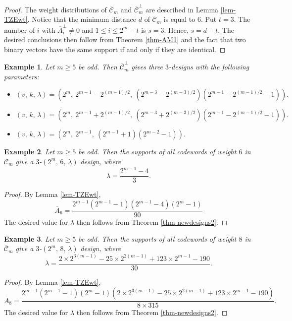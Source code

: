 \documentclass[1p,final]{elsarticle}
\newtheorem{example}{Example}
\newcommand{\C}{{\mathcal{C}}}
\begin{document}
\begin{proof}
The weight distributions of $\overline{\C}_m$ and $\overline{\C}_m^\perp$ are described in 
Lemma \ref{lem-TZEwt}. 
Notice that the minimum distance $d$ of $\overline{\C}_m$ is equal to $6$. Put $t=3$. The number
of $i$ with $\overline{A}_i^\perp \neq 0$ and $1 \leq i \leq 2^m -t$ is $s=3$. Hence, $s=d-t$.
The desired conclusions then follow from Theorem \ref{thm-AM1} and the fact that two binary 
vectors have the same support if and only if they are identical. 
\end{proof} 

\begin{example} 
Let $m \geq 5$ be odd. 
Then $\overline{\C}_m^\perp$ gives three $3$-designs with the following parameters: 
\begin{itemize}
\item $(v,\, k, \, \lambda)=\left(2^m,\  2^{m-1}-2^{(m-1)/2}, \ 
  (2^{m-3}-2^{(m-3)/2}) (2^{m-1}-2^{(m-1)/2}-1)   \right).$
\item $(v, \, k, \, \lambda)=\left(2^m, \ 2^{m-1}+2^{(m-1)/2}, \ 
  (2^{m-3}+2^{(m-3)/2}) (2^{m-1}-2^{(m-1)/2}-1)   \right).$  
\item $(v, \, k, \, \lambda)=\left(2^m, \ 2^{m-1}, \ 
  (2^{m-1}+1)(2^{m-2}-1) \right).$  
\end{itemize} 
\end{example} 


\begin{example} 
Let $m \geq 5$ be odd. 
Then the supports of all codewords of weight $6$ in $\overline{\C}_m$ give a $3$-$(2^m,\, 6,\, \lambda)$ design, where 
$$ 
\lambda= \frac{2^{m-1}-4}{3}. 
$$
\end{example} 

\begin{proof}
By Lemma  \ref{lem-TZEwt}, 
$$ 
\overline{A}_6 = \frac{2^{m-1} (2^{m-1}-1) (2^{m-1}-4)   (2^m-1)}{90}
$$
The desired value for $\lambda$ then follows from Theorem \ref{thm-newdesigns2}. 
\end{proof}


\begin{example} 
Let $m \geq 5$ be odd. 
Then the supports of all codewords of weight $8$ in $\overline{\C}_m$ give a $3$-$(2^m,\, 8,\, \lambda)$ design, where 
$$ 
\lambda= \frac{2 \times 2^{3(m-1)} - 25 \times 2^{2(m-1)} + 123 \times 2^{m-1} - 190}{30}. 
$$
\end{example} 

\begin{proof}
By Lemma  \ref{lem-TZEwt}, 
$$ 
\overline{A}_8 =   \frac{2^{m-1}(2^{m-1}-1)  (2^m-1) (2 \times 2^{3(m-1)} - 25 \times 2^{2(m-1)} + 123 \times 2^{m-1} - 190)}{8 \times 315}. 
$$
The desired value for $\lambda$ then follows from Theorem \ref{thm-newdesigns2}. 
\end{proof}
\end{document}
